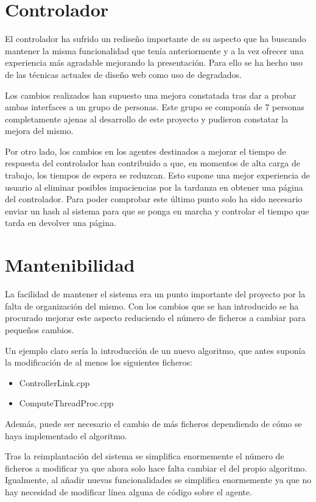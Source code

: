 \section{Controlador}

El controlador ha sufrido un rediseño importante de su aspecto que ha buscando mantener la misma funcionalidad que tenía anteriormente y a la vez ofrecer una experiencia más agradable mejorando la presentación. Para ello se ha hecho uso de las técnicas actuales de diseño web como uso de degradados.

Los cambios realizados han supuesto una mejora constatada tras dar a probar ambas interfaces a un grupo de personas. Este grupo se componía de 7 personas completamente ajenas al desarrollo de este proyecto y pudieron constatar la mejora del mismo.

Por otro lado, los cambios en los agentes destinados a mejorar el tiempo de respuesta del controlador han contribuido a que, en momentos de alta carga de trabajo, los tiempos de espera se reduzcan. Esto supone una mejor experiencia de usuario al eliminar posibles impaciencias por la tardanza en obtener una página del controlador. Para poder comprobar este último punto solo ha sido necesario enviar un hash al sistema para que se ponga en marcha y controlar el tiempo que tarda en devolver una página.

\section{Mantenibilidad}

La facilidad de mantener el sistema era un punto importante del proyecto por la falta de organización del mismo. Con los cambios que se han introducido se ha procurado mejorar este aspecto reduciendo el número de ficheros a cambiar para pequeños cambios.

Un ejemplo claro sería la introducción de un nuevo algoritmo, que antes suponía la modificación de al menos los siguientes ficheros:

\begin{itemize}
	\item ControllerLink.cpp
	\item ComputeThreadProc.cpp
\end{itemize}

Además, puede ser necesario el cambio de más ficheros dependiendo de cómo se haya implementado el algoritmo.

Tras la reimplantación del sistema se simplifica enormemente el número de ficheros a modificar ya que ahora solo hace falta cambiar el del propio algoritmo. Igualmente, al añadir nuevas funcionalidades se simplifica enormemente ya que no hay necesidad de modificar línea alguna de código sobre el agente.

